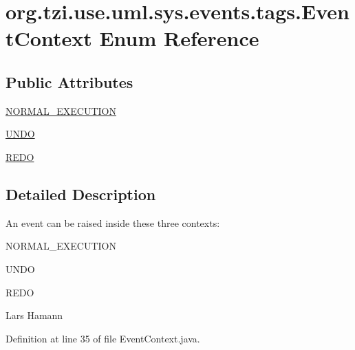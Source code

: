 \hypertarget{enumorg_1_1tzi_1_1use_1_1uml_1_1sys_1_1events_1_1tags_1_1_event_context}{\section{org.\-tzi.\-use.\-uml.\-sys.\-events.\-tags.\-Event\-Context Enum Reference}
\label{enumorg_1_1tzi_1_1use_1_1uml_1_1sys_1_1events_1_1tags_1_1_event_context}
}
\subsection*{Public Attributes}
\begin{DoxyCompactItemize}
\item 
\hyperlink{enumorg_1_1tzi_1_1use_1_1uml_1_1sys_1_1events_1_1tags_1_1_event_context_af5838068de73527d6d4898b2c1dd6a78}{N\-O\-R\-M\-A\-L\-\_\-\-E\-X\-E\-C\-U\-T\-I\-O\-N}
\item 
\hyperlink{enumorg_1_1tzi_1_1use_1_1uml_1_1sys_1_1events_1_1tags_1_1_event_context_aaf7e0e8e9c4ce2ec46afbf7eceb53d53}{U\-N\-D\-O}
\item 
\hyperlink{enumorg_1_1tzi_1_1use_1_1uml_1_1sys_1_1events_1_1tags_1_1_event_context_aeac24c537ca05505b77e0910b17f390f}{R\-E\-D\-O}
\end{DoxyCompactItemize}


\subsection{Detailed Description}
An event can be raised inside these three contexts\-: 
\begin{DoxyItemize}
\item N\-O\-R\-M\-A\-L\-\_\-\-E\-X\-E\-C\-U\-T\-I\-O\-N 
\item U\-N\-D\-O 
\item R\-E\-D\-O 
\begin{DoxyItemize}
\item 
\end{DoxyItemize}Lars Hamann 
\end{DoxyItemize}

Definition at line 35 of file Event\-Context.\-java.



